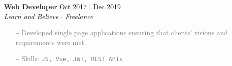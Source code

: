 \documentclass[a4paper]{article}
\newcommand{\linkedlist}[1]{
  \begin{tikzpicture}[remember picture]%
    \node (#1) [text,circle,fill,inner sep=1.5pt]{};
  \end{tikzpicture}%
}
\begin{document}

\textbf{Web Developer} \hfill \textcolor{black}{Oct 2017 | Dec 2019}\\
\textit{Learn and Believe $\cdot$ Freelance}\\
\vspace{-1mm}
\begin{itemize} \itemsep 1pt
	\item[--] \textcolor{gray}{Developed single page applications ensuring that clients’ visions and requirements were met.}
	\item[--] \textcolor{gray}{Skills: \texttt{JS, Vue, JWT, REST APIs}}
\end{itemize}
\end{document}
